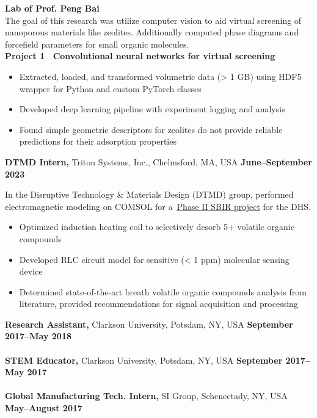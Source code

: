 \documentclass[margin,line]{res}
\begin{document}
\begin{resume}
	\newpage{}
	\begin{adjustwidth}{1.5em}{0pt}
		{\bf Lab of Prof. Peng Bai}\\
		The goal of this research was utilize computer vision to aid virtual
		screening of nanoporous materials like zeolites. Additionally computed
		phase diagrams and forcefield parameters for small organic molecules.
		\\
		{\bf Project 1~\textendash{} Convolutional neural networks for virtual
		screening}
		\begin{itemize}
			\item Extracted, loaded, and transformed volumetric data (> 1 GB) using
			      HDF5 wrapper for Python and custom PyTorch classes
			\item Developed deep learning pipeline with experiment logging and
			      analysis
			\item Found simple geometric descriptors for zeolites do not provide
			      reliable predictions for their adsorption properties
		\end{itemize}
	\end{adjustwidth}
	{\bf DTMD Intern,} Triton Systems, Inc., Chelmsford, MA, USA
	\hfill {\bf June--September 2023}
	\begin{adjustwidth}{1.5em}{0pt}
		In the Disruptive Technology \& Materials Design (DTMD) group, performed
		electromagnetic modeling on COMSOL for
		a~\href{https://legacy.www.sbir.gov/sbirsearch/detail/2234557}{Phase II
			SBIR project} for the DHS.
		\begin{itemize}
			\item Optimized induction heating coil to selectively desorb 5+ volatile
			      organic compounds
			\item Developed RLC circuit model for sensitive (< 1 ppm) molecular sensing
			      device
			\item Determined state-of-the-art breath volatile organic compounds
			      analysis from literature, provided recommendations for signal
			      acquisition and processing
		\end{itemize}
	\end{adjustwidth}
	{\bf Research Assistant,} Clarkson University, Potsdam, NY, USA
	\hfill {\bf September 2017--May 2018}\\
	\\
	{\bf STEM Educator,} Clarkson University, Potsdam, NY, USA
	\hfill {\bf September 2017--May 2017}\\
	\\
	{\bf Global Manufacturing Tech. Intern,} SI Group, Schenectady, NY, USA
	\hfill {\bf  May--August 2017}\\


\end{resume}
\end{document}
